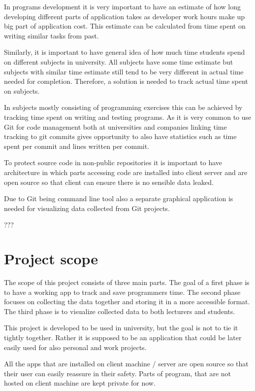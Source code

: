 In programs development it is very important to have an estimate of how long developing different parts of application takes as
developer work hours make up big part of application cost.
This estimate can be calculated from time spent on writing similar tasks from past.

Similarly, it is important to have general idea of how much time students spend on different subjects in university.
All subjects have some time estimate but subjects with similar time estimate still tend to be very different in actual
time needed for completion.
Therefore, a solution is needed to track actual time spent on subjects.

In subjects mostly consisting of programming exercises this can be achieved by tracking time spent on writing and testing programs.
As it is very common to use Git for code management both at universities and companies linking time tracking to git commits
gives opportunity to also have statistics such as time spent per commit and lines written per commit.

To protect source code in non-public repositories it is important to have architecture in which parts accessing code are
installed into client server and are open source so that client can ensure there is no sensible data leaked.

Due to Git being command line tool also a separate graphical application is needed for visualizing data collected
from Git projects.

???

\section{Project scope}\label{sec:project-scope}
The scope of this project consists of three main parts.
The goal of a first phase is to have a working app to track and save programmers time.
The second phase focuses on collecting the data together and storing it in a more accessible format.
The third phase is to visualize collected data to both lecturers and students.

This project is developed to be used in university, but the goal is not to tie it tightly together.
Rather it is supposed to be an application that could be later easily used for also personal and work projects.

All the apps that are installed on client machine / server are open source so that their user can easily reassure in their safety.
Parts of program, that are not hosted on client machine are kept private for now.